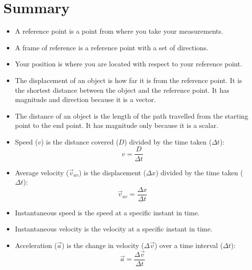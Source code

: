             \section{Summary}
            \nopagebreak
      \label{m38796*id80622}\begin{itemize}[noitemsep]
            \label{m38796*uid154}\item A reference point is a point from where you take your measurements.
\label{m38796*uid155}\item A frame of reference is a reference point with a set of directions.
\label{m38796*uid156}\item Your position is where you are located with respect to your reference point.
\label{m38796*uid157}\item The displacement of an object is how far it is from the reference point. It is the shortest distance between the object and the reference point. It has magnitude and direction because it is a vector.
\label{m38796*uid158}\item The distance of an object is the length of the path travelled from the starting point to the end point. It has magnitude only because it is a scalar.
\label{m38796*uid161}\item Speed ($v$) is the distance covered ($D$) divided by the time taken ($\Delta t$):
\label{m38796*id80758}\nopagebreak\noindent{}
    \begin{equation}
    v=\frac{D}{\Delta t}
      \end{equation}
    \label{m38796*uid162}\item Average velocity ($\vec{v}_{av}$) is the displacement ($\Delta x$) divided by the time taken ($\Delta t$):
\label{m38796*id80827}\nopagebreak\noindent{}
    \begin{equation}
    \vec{v}_{av}=\frac{\Delta x}{\Delta t}
      \end{equation}
    \label{m38796*uid163}\item Instantaneous speed is the speed at a specific instant in time.
\label{m38796*uid164}\item Instantaneous velocity is the velocity at a specific instant in time.
\label{m38796*uid165}\item Acceleration ($\vec{a}$) is the change in velocity ($\Delta \vec{v}$) over a time interval ($\Delta t$):
\label{m38796*id80925}\nopagebreak\noindent{}
    \begin{equation}
    \vec{a}=\frac{\Delta \vec{v}}{\Delta t}
      \end{equation}

\end{itemize}
